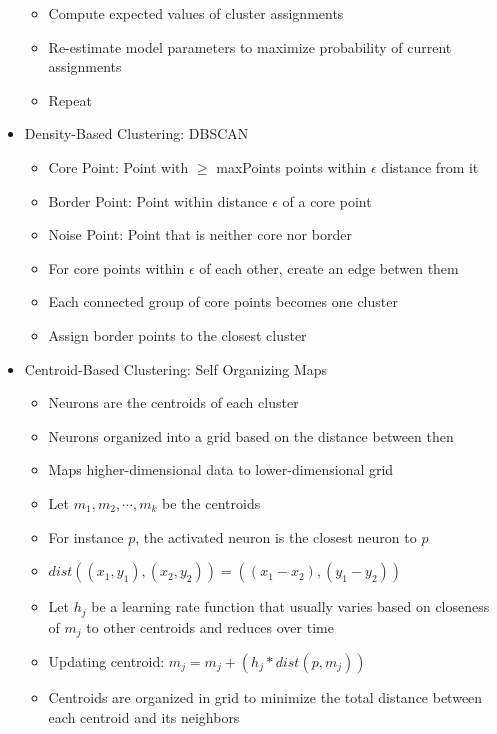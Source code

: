 \documentclass{article}
\begin{document}
\begin{itemize}
		\begin{itemize}
			\item Compute expected values of cluster assignments
			\item Re-estimate model parameters to maximize probability of current assignments
			\item Repeat
		\end{itemize}
	\item Density-Based Clustering: DBSCAN
		\begin{itemize}
			\item Core Point: Point with $\geq$ maxPoints points within $\epsilon$ distance from it
			\item Border Point: Point within distance $\epsilon$ of a core point
			\item Noise Point: Point that is neither core nor border
			\item For core points within $\epsilon$ of each other, create an edge betwen them
			\item Each connected group of core points becomes one cluster
			\item Assign border points to the closest cluster
		\end{itemize}
	\item Centroid-Based Clustering: Self Organizing Maps
		\begin{itemize}
			\item Neurons are the centroids of each cluster
			\item Neurons organized into a grid based on the distance between then
			\item Maps higher-dimensional data to lower-dimensional grid
			\item Let $m_1, m_2, \cdots, m_k$ be the centroids
			\item For instance $p$, the activated neuron is the closest neuron to $p$
			\item $dist( (x_1, y_1), (x_2, y_2) ) = ( (x_1 - x_2), (y_1 - y_2) )$
			\item Let $h_j$ be a learning rate function that usually varies based on closeness of $m_j$ to other centroids and reduces over time
			\item Updating centroid: $m_j = m_j + (h_j * dist(p, m_j))$
			\item Centroids are organized in grid to minimize the total distance between each centroid and its neighbors
		\end{itemize}
\end{itemize}
\end{document}
